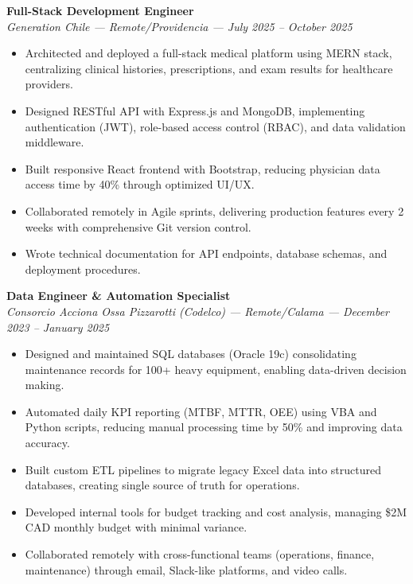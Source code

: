\documentclass[10pt,letterpaper]{article}
\begin{document}
\noindent \textbf{Full-Stack Development Engineer} \\
\textit{Generation Chile — Remote/Providencia — July 2025 – October 2025}
\begin{itemize}
    \item Architected and deployed a full-stack medical platform using MERN stack, centralizing clinical histories, prescriptions, and exam results for healthcare providers.
    \item Designed RESTful API with Express.js and MongoDB, implementing authentication (JWT), role-based access control (RBAC), and data validation middleware.
    \item Built responsive React frontend with Bootstrap, reducing physician data access time by 40\% through optimized UI/UX.
    \item Collaborated remotely in Agile sprints, delivering production features every 2 weeks with comprehensive Git version control.
    \item Wrote technical documentation for API endpoints, database schemas, and deployment procedures.
\end{itemize}

\vspace{0.2cm}

\noindent \textbf{Data Engineer \& Automation Specialist} \\
\textit{Consorcio Acciona Ossa Pizzarotti (Codelco) — Remote/Calama — December 2023 – January 2025}
\begin{itemize}
    \item Designed and maintained SQL databases (Oracle 19c) consolidating maintenance records for 100+ heavy equipment, enabling data-driven decision making.
    \item Automated daily KPI reporting (MTBF, MTTR, OEE) using VBA and Python scripts, reducing manual processing time by 50\% and improving data accuracy.
    \item Built custom ETL pipelines to migrate legacy Excel data into structured databases, creating single source of truth for operations.
    \item Developed internal tools for budget tracking and cost analysis, managing \$2M CAD monthly budget with minimal variance.
    \item Collaborated remotely with cross-functional teams (operations, finance, maintenance) through email, Slack-like platforms, and video calls.
\end{itemize}
\end{document}
